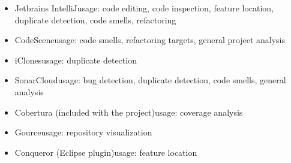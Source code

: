 \documentclass{article}
\begin{document}
\begin{itemize}
	\item Jetbrains IntelliJ\newline usage: code editing, code inspection, feature location, duplicate detection, code smells, refactoring
	\item CodeScene\newline usage: code smells, refactoring targets, general project analysis
	\item iClones\newline usage: duplicate detection
	\item SonarCloud\newline usage: bug detection, duplicate detection, code smells, general analysis
	\item Cobertura (included with the project)\newline usage: coverage analysis
	\item Gource\newline usage: repository visualization
	\item Conqueror (Eclipse plugin)\newline usage: feature location
\end{itemize}

\newpage

\end{document}
